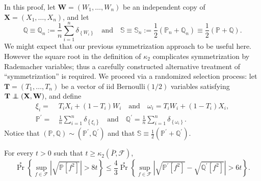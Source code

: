 In this proof, let \(\mathbf{W} = \left( W_{1}, \dots, W_{n} \right)\) be an
independent copy of \(\mathbf{X} = \left( X_{1}, \dots, X_{n} \right)\), and let
\begin{equation}
  \mathbb{Q} \equiv \mathbb{Q}_{n} := \frac{1}{n} \sum_{i = 1}^{n}
  \delta_{\left\{ W_{i} \right\}} \quad \text{and} \quad \mathbb{S} \equiv
  \mathbb{S}_{n} := \frac{1}{2} \left( \mathbb{P}_{n} + \mathbb{Q}_{n} \right)
  \equiv \frac{1}{2} \left( \mathbb{P} + \mathbb{Q} \right).
\end{equation}
We might expect that our previous symmetrization approach to be useful here.
However the square root in the definition of \(\kappa_{2}\) complicates
symmetrization by Rademacher variables; thus a carefully constructed alternative
treatment of ``symmetrization'' is required.
We proceed via a randomized selection process: let \(\mathbf{T} = \left( T_{1},
\dots, T_{n} \right)\) be a vector of iid \(\mathrm{Bernoulli} (1 / 2)\)
variables satisfying \(\mathbf{T} \mathrel{\perp \mspace{-11mu} \perp} (\mathbf{X}, \mathbf{W})\), and define
\begin{equation}
  \begin{split}
    \xi_{i} =
    & \, T_{i} X_{i} + \left( 1 - T_{i} \right) W_{i} \quad \text{and} \quad
    \omega_{i} = T_{i} W_{i} + \left( 1 - T_{i} \right) X_{i}, \\
    \mathbb{P}^{\prime} =
    & \, \frac{1}{n} \sum_{i = 1}^{n} \delta_{\left\{ \xi_{i} \right\}} \quad
    \text{and} \quad \mathbb{Q}^{\prime} = \frac{1}{n} \sum_{i = 1}^{n}
    \delta_{\left\{ \omega_{i} \right\}}.
  \end{split}
\end{equation}
Notice that \((\mathbb{P}, \mathbb{Q}) \sim \left( \mathbb{P}^{\prime},
\mathbb{Q}^{\prime} \right)\) and that \(\mathbb{S} \equiv \frac{1}{2} \left(
\mathbb{P}^{\prime} + \mathbb{Q}^{\prime} \right)\).

\begin{lemma}
\label{lem--sqrt-ep-2nd-moment-ratio-symm-bound-1}
For every \(t > 0 \) such that \(t \geq \kappa_{2} \left( \overline{P},
\mathcal{F} \right)\),
\begin{equation}
  \Pr^{\ast} \left\{ \sup_{f \in \mathcal{F}} \left| \sqrt{\mathbb{P} \left[
  f^{2} \right]} \right| > 8 t \right\} \leq
  \frac{4}{3} \Pr^{\ast} \left\{ \sup_{f \in \mathcal{F}} \left|
  \sqrt{\mathbb{P}^{\prime} \left[ f^{2} \right]} - \sqrt{\mathbb{Q}^{\prime}
  \left[ f^{2} \right]} \right| > 6 t \right\}.
  \label{eqn--sqrt-ep-2nd-moment-ratio-symm-bound-1}
\end{equation}
\end{lemma}

